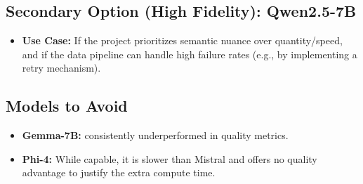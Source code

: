 \documentclass[12pt, a4paper]{article}
\begin{document}
\subsection*{Secondary Option (High Fidelity): Qwen2.5-7B}
\begin{itemize}
    \item \textbf{Use Case:} If the project prioritizes semantic nuance over quantity/speed, and if the data pipeline can handle high failure rates (e.g., by implementing a retry mechanism).
\end{itemize}

\subsection*{Models to Avoid}
\begin{itemize}
    \item \textbf{Gemma-7B:} consistently underperformed in quality metrics.
    \item \textbf{Phi-4:} While capable, it is slower than Mistral and offers no quality advantage to justify the extra compute time.
\end{itemize}
\end{document}
